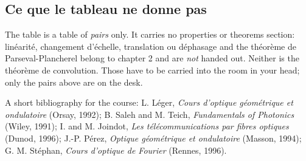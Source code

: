 \subsection{Ce que le tableau ne donne pas}

\begin{remark}
  The table is a table of \emph{pairs} only. It carries no properties or
  theorems section: linéarité, changement d'échelle, translation ou déphasage
  and the théorème de Parseval-Plancherel belong to chapter 2 and are \emph{not} handed out. Neither is the théorème de
  convolution. Those have to be carried into the room in your head; only the
  pairs above are on the desk.
\end{remark}

A short bibliography for the course: L. Léger, \textit{Cours d'optique
géométrique et ondulatoire} (Orsay, 1992); B. Saleh and
M. Teich, \textit{Fundamentals of Photonics} (Wiley, 1991); I. and M. Joindot,
\textit{Les télécommunications par fibres optiques} (Dunod, 1996); J.-P. Pérez,
\textit{Optique géométrique et ondulatoire} (Masson, 1994); G. M. Stéphan,
\textit{Cours d'optique de Fourier} (Rennes, 1996).
